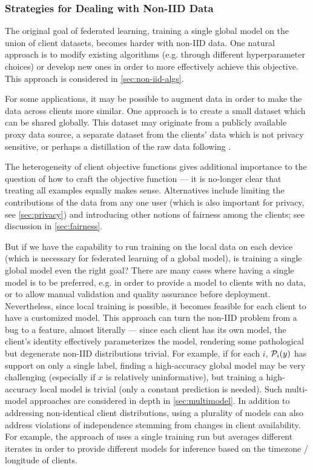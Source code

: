 \documentclass[11pt]{article}
\begin{document}
\subsubsection{Strategies for Dealing with Non-IID Data}

The original goal of federated learning, training a single global model on the union of client datasets, becomes harder with non-IID data. One natural approach is to modify existing algorithms (e.g. through different hyperparameter choices) or develop new ones in order to more effectively achieve this objective. This approach is considered in \cref{sec:non-iid-algs}.

For some applications, it may be possible to augment data in order to make the data across clients more similar. One approach is to create a small dataset which can be shared globally. This dataset may originate from a publicly available proxy data source, a separate dataset from the clients’ data which is not privacy sensitive, or perhaps a distillation of the raw data following \citet{wang2018dataset}.

The heterogeneity of client objective functions gives additional importance to the question of how to craft the objective function --- it is no-longer clear that treating all examples equally makes sense. Alternatives include limiting the contributions of the data from any one user (which is also important for privacy, see \cref{sec:privacy}) and introducing other notions of fairness among the clients; see discussion in \cref{sec:fairness}. 

But if we have the capability to run training on the local data on each device (which is necessary for federated learning of a global model), is training a single global model even the right goal? There are many cases where having a single model is to be preferred, e.g. in order to provide a model to clients with no data, or to allow manual validation and quality assurance before deployment. Nevertheless, since local training is possible, it becomes feasible for each client to have a customized model. This approach can turn the non-IID problem from a bug to a feature, almost literally --- since each client has its own model, the client's identity effectively parameterizes the model, rendering some pathological but degenerate non-IID distributions trivial. For example, if for each $i$,  $\mathcal{P}_i(y)$ has support on only a single label, finding a high-accuracy global model may be very challenging (especially if $x$ is relatively uninformative), but training a high-accuracy local model is trivial (only a constant prediction is needed). Such multi-model approaches are considered in depth in \cref{sec:multimodel}. In addition to addressing non-identical client distributions, using a plurality of models can also address violations of independence stemming from changes in client availability. For example, the approach of \citet{eichner19semicyclic} uses a single training run but averages different iterates in order to provide different models for inference based on the timezone / longitude of clients.
\end{document}
